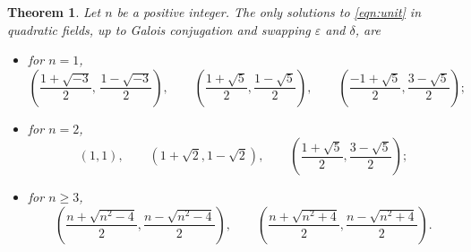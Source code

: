 \documentclass{amsart}
\newtheorem{thm}{Theorem}
\theoremstyle{definition}
\theoremstyle{remark}
\begin{document}
\begin{thm}
Let $n$ be a positive integer.
	The only solutions to \eqref{eqn:unit} in quadratic fields, up to Galois conjugation and swapping $\varepsilon$ and $\delta$,
	are
	\begin{itemize}
		\item for $n=1$,
		\[
			\left(\frac{1+\sqrt{-3}}{2}, \, \frac{1-\sqrt{-3}}{2} \right),
			\qquad
			\left(\frac{1+\sqrt{5}}{2}, \frac{1-\sqrt{5}}{2} \right),
			\qquad
			\left(\frac{-1+\sqrt{5}}{2}, \frac{3-\sqrt{5}}{2} \right);
		\]

		\item for $n=2$, 
		\[
			(1,1), \qquad (1+\sqrt{2},1-\sqrt{2}), \qquad
			\left(\frac{1+\sqrt{5}}{2}, \frac{3-\sqrt{5}}{2} \right);
		\]
		\item for $n \ge 3$,
		\[
			\left(\frac{n + \sqrt{n^2-4 }}{2}, 
			\frac{n - \sqrt{n^2-4 }}{2} \right), 
			\qquad
			\left(\frac{n + \sqrt{n^2+4 }}{2}, 
			\frac{n - \sqrt{n^2+4}}{2} \right).
		\]
	\end{itemize}
\end{thm}
\end{document}
